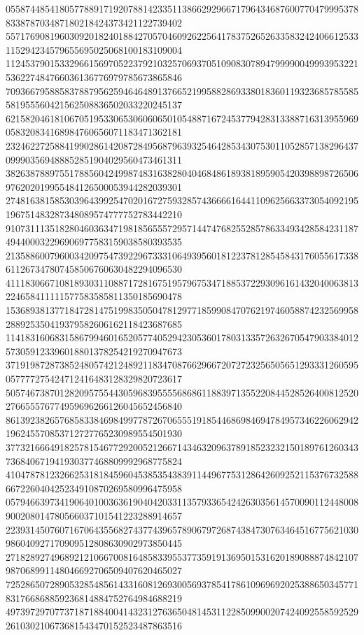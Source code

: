 \begin{DoxyCode}
      055874485418057788917192078814233511386629296671796434687600770479995378833878703487180218424373421122739402
      557176908196030920182401884270570460926225641783752652633583242406612533115294234579655695025068100183109004
      112453790153329661569705223792103257069370510908307894799990049993953221536227484766036136776979785673865846
      709366795885837887956259464648913766521995882869338018360119323685785585581955560421562508836502033220245137
      621582046181067051953306530606065010548871672453779428313388716313955969058320834168984760656071183471362181
      232462272588419902861420872849568796393254642853430753011052857138296437099903569488852851904029560473461311
      382638788975517885604249987483163828040468486189381895905420398898726506976202019955484126500053944282039301
      274816381585303964399254702016727593285743666616441109625663373054092195196751483287348089574777752783442210
      910731113518280460363471981856555729571447476825528578633493428584231187494400032296906977583159038580393535
      213588600796003420975473922967333106493956018122378128545843176055617338611267347807458506760630482294096530
      411183066710818930311088717281675195796753471885372293096161432040063813224658411111577583585811350185690478
      153689381377184728147519983505047812977185990847076219746058874232569958288925350419379582606162118423687685
      114183160683158679946016520577405294230536017803133572632670547903384012573059123396018801378254219270947673
      371919872873852480574212489211834708766296672072723256505651293331260595057777275424712416483128329820723617
      505746738701282095755443059683955556868611883971355220844528526400812520276655576774959696266126045652456840
      861392382657685833846984997787267065551918544686984694784957346226062942196245570853712727765230989554501930
      377321666491825781546772920052126671434632096378918523232150189761260343736840671941930377468809992968775824
      410478781232662531818459604538535438391144967753128642609252115376732588667226040425234910870269580996475958
      057946639734190640100363619040420331135793365424263035614570090112448008900208014780566037101541223288914657
      223931450760716706435568274377439657890679726874384730763464516775621030986040927170909512808630902973850445
      271828927496892121066700816485833955377359191369501531620189088874842107987068991148046692706509407620465027
      725286507289053285485614331608126930056937854178610969692025388650345771831766868859236814884752764984688219
      497397297077371871884004143231276365048145311228509900207424092558592529261030210673681543470152523487863516

\end{DoxyCode}
